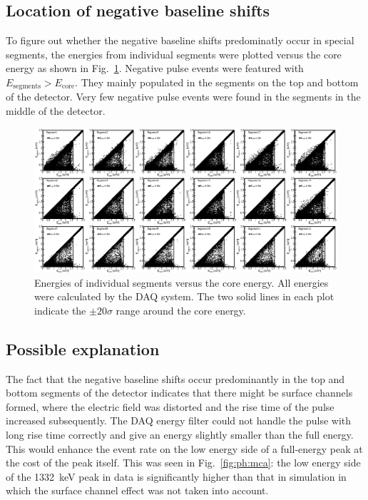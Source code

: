 \subsection{Location of negative baseline shifts}
\label{s:locneg}
To figure out whether the negative baseline shifts predominatly occur in special segments, the energies from individual segments were plotted versus the core energy as shown in Fig.~\ref{f:ii:EnegPulse}. Negative pulse events were featured with  $E_{\text{segments}} > E_{\text{core}}$. They mainly populated in the segments on the top and bottom of the detector. Very few negative pulse events were found in the segments in the middle of the detector.

\begin{figure}
\centering
\includegraphics{EnegPuls}
\caption{Energies of individual segments versus the core energy. All energies were calculated by the DAQ system. The two solid lines in each plot indicate the $\pm 20 \sigma$ range around the core energy.}
\label{f:ii:EnegPulse}
\end{figure}

\subsection{Possible explanation}
\label{s:ii:exp}
The fact that the negative baseline shifts occur predominantly in the top and bottom segments of the detector indicates that there might be surface channels~\cite{Sur05} formed, where the electric field was distorted and the rise time of the pulse increased subsequently. The DAQ energy filter could not handle the pulse with long rise time correctly and give an energy slightly smaller than the full energy. This would enhance the event rate on the low energy side of a full-energy peak at the cost of the peak itself. This was seen in Fig.~\ref{fig:ph:mca}: the low energy side of the 1332~keV peak in data is significantly higher than that in simulation in which the surface channel effect was not taken into account.

